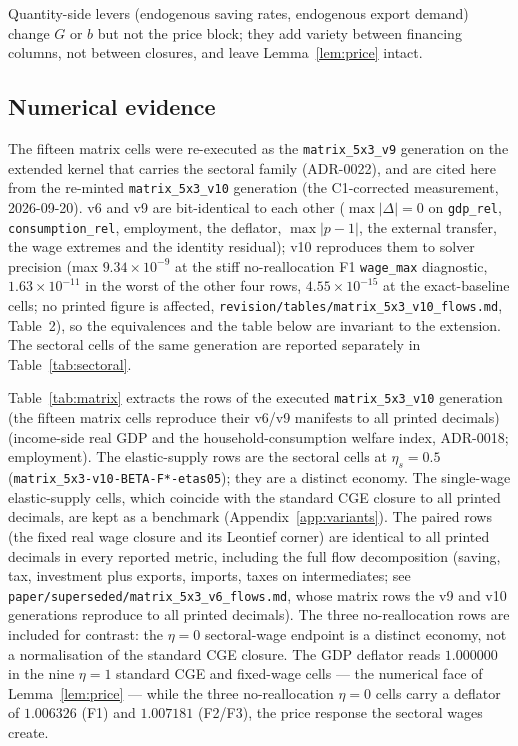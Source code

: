 Quantity-side levers (endogenous saving rates, endogenous export demand)
change $G$ or $b$ but not the price block; they add variety between
financing columns, not between closures, and leave Lemma~\ref{lem:price}
intact.

\subsection{Numerical evidence}\label{app:eqnumevidence}

The fifteen matrix cells were re-executed as the
\texttt{matrix\_5x3\_v9} generation on the extended kernel that carries the
sectoral family (ADR-0022), and are cited here from the
re-minted \texttt{matrix\_5x3\_v10} generation (the
C1-corrected measurement, 2026-09-20). v6 and v9 are bit-identical to each
other ($\max|\Delta| = 0$ on \texttt{gdp\_rel}, \texttt{consumption\_rel},
employment, the deflator, $\max|p-1|$, the external transfer, the wage extremes
and the identity residual); v10 reproduces them to solver precision (max
$9.34\times10^{-9}$ at the stiff no-reallocation F1 \texttt{wage\_max}
diagnostic,
$1.63\times10^{-11}$ in the worst of the other four rows,
$4.55\times10^{-15}$ at the exact-baseline cells; no printed figure is
affected, \texttt{revision/tables/matrix\_5x3\_v10\_flows.md}, Table~2), so the
equivalences and the table below are invariant to the extension. The sectoral
cells of the same generation are reported separately in
Table~\ref{tab:sectoral}.

Table~\ref{tab:matrix} extracts the rows of the executed
\texttt{matrix\_5x3\_v10} generation (the fifteen matrix
cells reproduce their v6/v9 manifests to all printed decimals) (income-side real GDP and the
household-consumption welfare index, ADR-0018; employment). The elastic-supply
rows are the sectoral
cells at $\eta_s = 0.5$ (\texttt{matrix\_5x3-v10-BETA-F*-etas05}); they are a
distinct economy. The single-wage elastic-supply cells, which coincide with
the standard CGE closure to
all printed decimals, are kept as a benchmark (Appendix~\ref{app:variants}).
The paired rows (the fixed real wage closure and its Leontief corner) are
identical to all printed decimals in every
reported metric, including the full flow decomposition (saving, tax,
investment plus exports, imports, taxes on intermediates; see
\texttt{paper/superseded/matrix\_5x3\_v6\_flows.md}, whose matrix rows the v9 and v10
generations reproduce to all printed decimals). The
three no-reallocation rows are included for contrast: the $\eta = 0$
sectoral-wage
endpoint is a distinct economy, not a normalisation of the standard CGE
closure. The GDP
deflator reads $1.000000$ in the nine $\eta = 1$ standard CGE and
fixed-wage cells --- the numerical face of Lemma~\ref{lem:price} --- while
the three no-reallocation
$\eta = 0$ cells carry a deflator of $1.006326$ (F1) and $1.007181$
(F2/F3), the price response the sectoral wages create.

